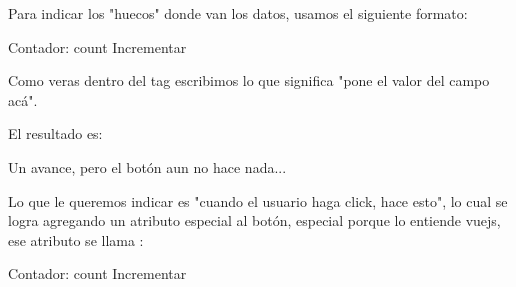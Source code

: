 \documentclass[letterpaper,10pt,spanish]{sphinxmanual}
\begin{document}
Para indicar los "huecos" donde van los datos, usamos el siguiente formato:

%
\begin{sphinxVerbatim}[commandchars=\\\{\}]
 
    Contador: \PYGZob{}\PYGZob{}count\PYGZcb{}\PYGZcb{}
    Incrementar
\end{sphinxVerbatim}

Como veras dentro del tag  escribimos  lo que significa "pone el valor del campo  acá".

El resultado es:





Un avance, pero el botón aun no hace nada...

Lo que le queremos indicar es "cuando el usuario haga click, hace esto",
lo cual se logra agregando un atributo especial al botón, especial porque
lo entiende vuejs, ese atributo se llama :

%
\begin{sphinxVerbatim}[commandchars=\\\{\}]
 
    Contador: \PYGZob{}\PYGZob{}count\PYGZcb{}\PYGZcb{}
     Incrementar
\end{sphinxVerbatim}
\end{document}
